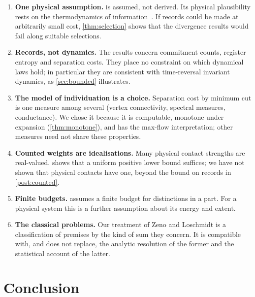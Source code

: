 \documentclass[10pt,twocolumn,a4paper]{article}
\begin{document}
\begin{enumerate}[label=(\arabic*)]
\item \textbf{One physical assumption.}  is assumed, not
derived. Its physical plausibility rests on the thermodynamics of
information~\citep{landauer1961,bennett1982,berut2012}. If records could be
made at arbitrarily small cost, \cref{thm:selection} shows that the
divergence results would fail along suitable selections.
\item \textbf{Records, not dynamics.} The results concern commitment counts,
register entropy and separation costs. They place no constraint on which
dynamical laws hold; in particular they are consistent with time-reversal
invariant dynamics, as \cref{sec:bounded} illustrates.
\item \textbf{The model of individuation is a choice.} Separation cost by
minimum cut is one measure among several (vertex connectivity, spectral
measures, conductance). We chose it because it is computable, monotone under
expansion (\cref{thm:monotone}), and has the max-flow interpretation; other
measures need not share these properties.
\item \textbf{Counted weights are idealisations.} Many physical contact
strengths are real-valued.  shows that a uniform positive
lower bound suffices; we have not shown that physical contacts have one,
beyond the bound on records in \cref{post:counted}.
\item \textbf{Finite budgets.}  assumes a finite budget for
distinctions in a part. For a physical system this is a further assumption
about its energy and extent.
\item \textbf{The classical problems.} Our treatment of Zeno and Loschmidt is
a classification of premises by the kind of sum they concern. It is
compatible with, and does not replace, the analytic resolution of the former
and the statistical account of the latter.
\end{enumerate}

\section{Conclusion}
\label{sec:conclusion}
\end{document}
